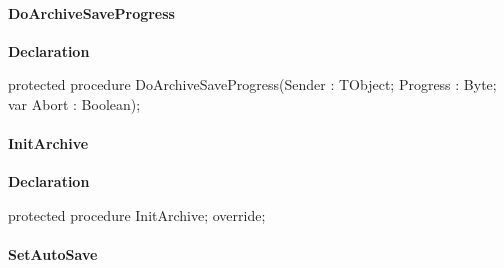 \documentclass{report}
\newif\ifpdf
\begin{document}
\paragraph*{DoArchiveSaveProgress}\hspace*{\fill}

\label{AbZipper.TAbCustomZipper-DoArchiveSaveProgress}
\begin{list}{}{
\setlength{\itemindent}{0cm}
\setlength{\listparindent}{0cm}
\setlength{\leftmargin}{\evensidemargin}
\addtolength{\leftmargin}{\tmplength}
\settowidth{\labelsep}{X}
\addtolength{\leftmargin}{\labelsep}
\setlength{\labelwidth}{\tmplength}
}
\item[\textbf{Declaration}\hfill]
\ifpdf
\begin{flushleft}
\fi
\begin{ttfamily}
protected procedure DoArchiveSaveProgress(Sender : TObject; Progress : Byte; var Abort : Boolean);\end{ttfamily}

\ifpdf
\end{flushleft}
\fi

\end{list}
\paragraph*{InitArchive}\hspace*{\fill}

\label{AbZipper.TAbCustomZipper-InitArchive}
\begin{list}{}{
\setlength{\itemindent}{0cm}
\setlength{\listparindent}{0cm}
\setlength{\leftmargin}{\evensidemargin}
\addtolength{\leftmargin}{\tmplength}
\settowidth{\labelsep}{X}
\addtolength{\leftmargin}{\labelsep}
\setlength{\labelwidth}{\tmplength}
}
\item[\textbf{Declaration}\hfill]
\ifpdf
\begin{flushleft}
\fi
\begin{ttfamily}
protected procedure InitArchive; override;\end{ttfamily}

\ifpdf
\end{flushleft}
\fi

\end{list}
\paragraph*{SetAutoSave}\hspace*{\fill}
\end{document}
